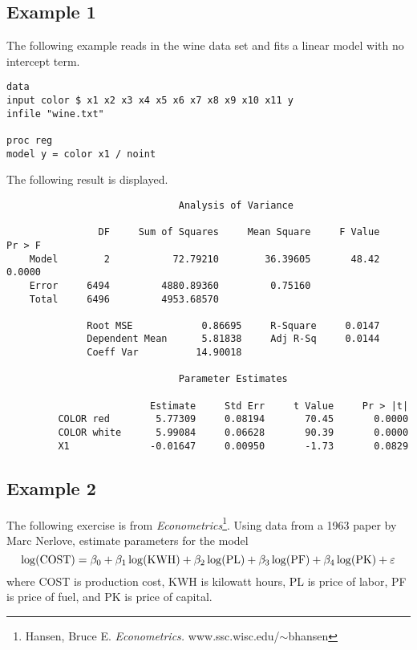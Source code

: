 \documentclass[12pt]{article}
\begin{document}
\subsection*{Example 1}
The following example reads in the wine data set and fits
a linear model with no intercept term.

\begin{Verbatim}
data
input color $ x1 x2 x3 x4 x5 x6 x7 x8 x9 x10 x11 y
infile "wine.txt"

proc reg
model y = color x1 / noint
\end{Verbatim}

The following result is displayed.

\begin{Verbatim}
                              Analysis of Variance

                DF     Sum of Squares     Mean Square     F Value     Pr > F
    Model        2           72.79210        36.39605       48.42     0.0000
    Error     6494         4880.89360         0.75160                       
    Total     6496         4953.68570                                       

              Root MSE            0.86695     R-Square     0.0147
              Dependent Mean      5.81838     Adj R-Sq     0.0144
              Coeff Var          14.90018                        

                              Parameter Estimates

                         Estimate     Std Err     t Value     Pr > |t|
         COLOR red        5.77309     0.08194       70.45       0.0000
         COLOR white      5.99084     0.06628       90.39       0.0000
         X1              -0.01647     0.00950       -1.73       0.0829
\end{Verbatim}

\subsection*{Example 2}
The following exercise is from {\it Econometrics}\footnote{
Hansen, Bruce E. {\it Econometrics.}
www.ssc.wisc.edu/$\sim$bhansen}.
Using data from a 1963 paper by Marc Nerlove,
estimate parameters for the model
\[
\log({\rm COST})=\beta_0+\beta_1\log({\rm KWH})
+\beta_2\log({\rm PL})+\beta_3\log({\rm PF})+\beta_4\log({\rm PK})
+\varepsilon
\]
where COST is production cost,
KWH is kilowatt hours,
PL is price of labor,
PF is price of fuel,
and PK is price of capital.
\end{document}
